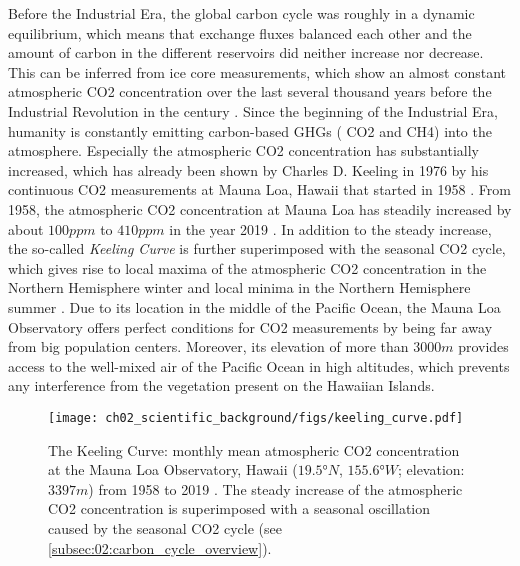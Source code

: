 Before the Industrial Era, the global carbon cycle was roughly in a dynamic
equilibrium, which means that exchange fluxes balanced each other and the
amount of carbon in the different reservoirs did neither increase nor decrease.
This can be inferred from ice core measurements, which show an almost constant
atmospheric \ac{CO2} concentration over the last several thousand years before
the Industrial Revolution in the  century \autocite{Ciais2013}. Since
the beginning of the Industrial Era, humanity is constantly emitting
carbon-based \acp{GHG} (\eg{} \ac{CO2} and \ac{CH4}) into the atmosphere.
Especially the atmospheric \ac{CO2} concentration has substantially increased,
which has already been shown by Charles D. Keeling in 1976 by his continuous
\ac{CO2} measurements at Mauna Loa, Hawaii that started in 1958
. From 1958, the
atmospheric \ac{CO2} concentration at Mauna Loa has steadily increased by about
$100 \unit{ppm}$ to $410 \unit{ppm}$ in the year 2019 \autocite{Keeling2005}.
In addition to the steady increase, the so-called \emph{Keeling Curve} is
further superimposed with the seasonal \ac{CO2} cycle, which gives rise to
local maxima of the atmospheric \ac{CO2} concentration in the Northern
Hemisphere winter and local minima in the Northern Hemisphere summer
. Due to
its location in the middle of the Pacific Ocean, the Mauna Loa Observatory
offers perfect conditions for \ac{CO2} measurements by being far away from big
population centers. Moreover, its elevation of more than $3000 \unit{m}$
provides access to the well-mixed air of the Pacific Ocean in high altitudes,
which prevents any interference from the vegetation present on the Hawaiian
Islands.

\begin{figure}[t]
  \centering
  \texttt{[image: 
    ch02\_scientific\_background/figs/keeling\_curve.pdf]}
  \caption{The Keeling Curve: monthly mean atmospheric \acs{CO2} concentration
    at the Mauna Loa Observatory, Hawaii ($19.5 \unit{\degree N}$, $155.6
    \unit{\degree W}$; elevation: $3397 \unit{m}$) from 1958 to 2019
    \autocite{Keeling2005}. The steady increase of the atmospheric \acs{CO2}
    concentration is superimposed with a seasonal oscillation caused by the
    seasonal \acs{CO2} cycle (see \cref{subsec:02:carbon_cycle_overview}).}
  \label{fig:02:keeling_curve}
\end{figure}

